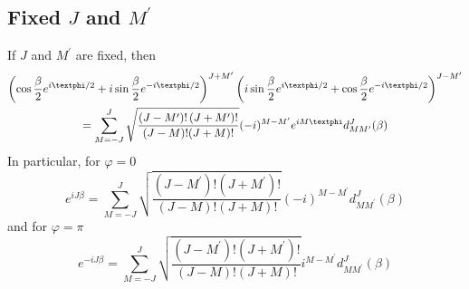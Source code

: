 \subsection{Fixed  $J$ and $M^{\prime}$}
If $J$ and $M^{\prime}$ are fixed, then
\begin{gather}
\left(\cos \frac{\beta}{2} e^{i \varphi / 2}+i \sin \frac{\beta}{2} e^{-i \varphi / 2}\right)^{J+M^{\prime}}\left(i \sin \frac{\beta}{2} e^{i \varphi / 2}+\cos \frac{\beta}{2} e^{-i \varphi / 2}\right)^{J-M^{\prime}}  \notag\\
=\sum_{M=-J}^{J} \sqrt{\frac{\left(J-M^{\prime}\right)!\left(J+M^{\prime}\right)!}{(J-M)!(J+M)!}}(-i)^{M-M^{\prime}} e^{i M \varphi} d_{M M^{\prime}}^{J}(\beta) \label{eq:4:13:1}
\end{gather}
In particular, for $\varphi=0$
\begin{equation}
e^{i J \beta}=\sum_{M=-J}^{J} \sqrt{\frac{\left(J-M^{\prime}\right)!\left(J+M^{\prime}\right)!}{(J-M)!(J+M)!}}(-i)^{M-M^{\prime}} d_{M M^{\prime}}^{J}(\beta) \label{eq:4:13:2}
\end{equation}
and for $\varphi=\pi$
\begin{equation}
e^{-i J \beta}=\sum_{M=-J}^{J} \sqrt{\frac{\left(J-M^{\prime}\right)!\left(J+M^{\prime}\right)!}{(J-M)!(J+M)!}} i^{M-M^{\prime}} d_{M M^{\prime}}^{J}(\beta) \label{eq:4:13:3}
\end{equation}

